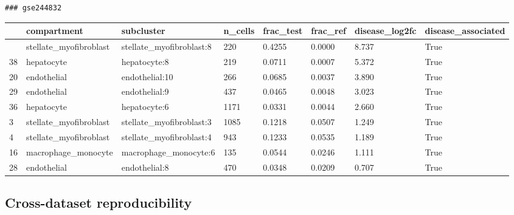\documentclass[
  letterpaper,
  DIV=11,
  numbers=noendperiod]{scrartcl}
\newcounter{none} %
\begin{document}
\begin{verbatim}
### gse244832
\end{verbatim}

{\def\LTcaptype{none} %
\begin{longtable}[]{@{}llllllll@{}}
\toprule\noalign{}
& compartment & subcluster & n\_cells & frac\_test & frac\_ref &
disease\_log2fc & disease\_associated \\
\midrule\noalign{}
\endhead
\bottomrule\noalign{}
\endlastfoot
8 & stellate\_myofibroblast & stellate\_myofibroblast:8 & 220 & 0.4255 &
0.0000 & 8.737 & True \\
38 & hepatocyte & hepatocyte:8 & 219 & 0.0711 & 0.0007 & 5.372 & True \\
20 & endothelial & endothelial:10 & 266 & 0.0685 & 0.0037 & 3.890 &
True \\
29 & endothelial & endothelial:9 & 437 & 0.0465 & 0.0048 & 3.023 &
True \\
36 & hepatocyte & hepatocyte:6 & 1171 & 0.0331 & 0.0044 & 2.660 &
True \\
3 & stellate\_myofibroblast & stellate\_myofibroblast:3 & 1085 & 0.1218
& 0.0507 & 1.249 & True \\
4 & stellate\_myofibroblast & stellate\_myofibroblast:4 & 943 & 0.1233 &
0.0535 & 1.189 & True \\
16 & macrophage\_monocyte & macrophage\_monocyte:6 & 135 & 0.0544 &
0.0246 & 1.111 & True \\
28 & endothelial & endothelial:8 & 470 & 0.0348 & 0.0209 & 0.707 &
True \\
\end{longtable}
}

\subsection{Cross-dataset
reproducibility}\label{cross-dataset-reproducibility}
\end{document}
